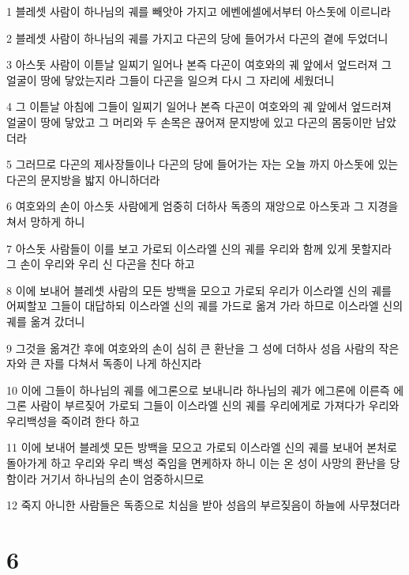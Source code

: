 \par 1 블레셋 사람이 하나님의 궤를 빼앗아 가지고 에벤에셀에서부터 아스돗에 이르니라
\par 2 블레셋 사람이 하나님의 궤를 가지고 다곤의 당에 들어가서 다곤의 곁에 두었더니
\par 3 아스돗 사람이 이튿날 일찌기 일어나 본즉 다곤이 여호와의 궤 앞에서 엎드러져 그 얼굴이 땅에 닿았는지라 그들이 다곤을 일으켜 다시 그 자리에 세웠더니
\par 4 그 이튿날 아침에 그들이 일찌기 일어나 본즉 다곤이 여호와의 궤 앞에서 엎드러져 얼굴이 땅에 닿았고 그 머리와 두 손목은 끊어져 문지방에 있고 다곤의 몸둥이만 남았더라
\par 5 그러므로 다곤의 제사장들이나 다곤의 당에 들어가는 자는 오늘 까지 아스돗에 있는 다곤의 문지방을 밟지 아니하더라
\par 6 여호와의 손이 아스돗 사람에게 엄중히 더하사 독종의 재앙으로 아스돗과 그 지경을 쳐서 망하게 하니
\par 7 아스돗 사람들이 이를 보고 가로되 이스라엘 신의 궤를 우리와 함께 있게 못할지라 그 손이 우리와 우리 신 다곤을 친다 하고
\par 8 이에 보내어 블레셋 사람의 모든 방백을 모으고 가로되 우리가 이스라엘 신의 궤를 어찌할꼬 그들이 대답하되 이스라엘 신의 궤를 가드로 옮겨 가라 하므로 이스라엘 신의 궤를 옮겨 갔더니
\par 9 그것을 옮겨간 후에 여호와의 손이 심히 큰 환난을 그 성에 더하사 성읍 사람의 작은 자와 큰 자를 다쳐서 독종이 나게 하신지라
\par 10 이에 그들이 하나님의 궤를 에그론으로 보내니라 하나님의 궤가 에그론에 이른즉 에그론 사람이 부르짖어 가로되 그들이 이스라엘 신의 궤를 우리에게로 가져다가 우리와 우리백성을 죽이려 한다 하고
\par 11 이에 보내어 블레셋 모든 방백을 모으고 가로되 이스라엘 신의 궤를 보내어 본처로 돌아가게 하고 우리와 우리 백성 죽임을 면케하자 하니 이는 온 성이 사망의 환난을 당함이라 거기서 하나님의 손이 엄중하시므로
\par 12 죽지 아니한 사람들은 독종으로 치심을 받아 성읍의 부르짖음이 하늘에 사무쳤더라

\chapter{6}

